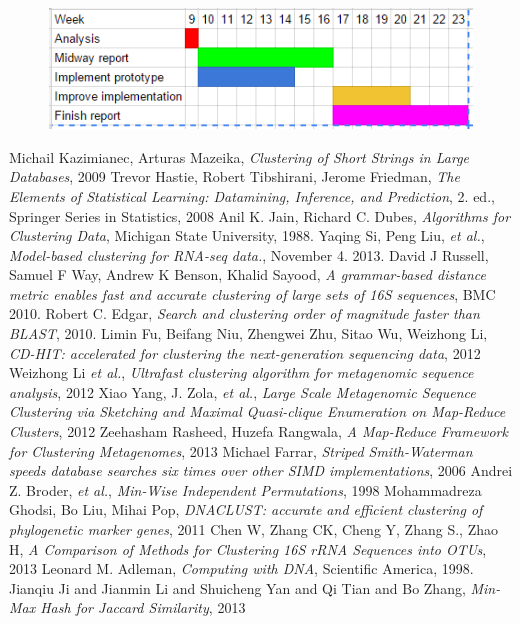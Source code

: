 \documentclass[10pt,a4paper]{article} %
\begin{document}
\begin{figure}[H]
\includegraphics[scale=1]{Gantt}
\end{figure}


\clearpage
\begin{thebibliography}{9}
   Michail Kazimianec, Arturas Mazeika, \emph{Clustering of Short Strings in Large Databases}, 2009
   Trevor Hastie, Robert Tibshirani, Jerome Friedman, \emph{The Elements of Statistical Learning: Datamining, Inference, and Prediction}, 2. ed., Springer Series in Statistics, 2008
   Anil K. Jain, Richard C. Dubes, \emph{Algorithms for Clustering Data}, Michigan State University, 1988.
   Yaqing Si, Peng Liu, \emph{et al.}, \emph{Model-based clustering for RNA-seq data.}, November 4. 2013.
   David J Russell, Samuel F Way, Andrew K Benson, Khalid Sayood, \emph{A grammar-based distance metric enables fast and accurate clustering of large sets of 16S sequences}, BMC 2010.
   Robert C. Edgar, \emph{Search and clustering order of magnitude faster than BLAST}, 2010.
   Limin Fu, Beifang Niu, Zhengwei Zhu, Sitao Wu, Weizhong Li, \emph{CD-HIT: accelerated for clustering the next-generation sequencing data}, 2012
  Weizhong Li \emph{et al.}, \emph{Ultrafast clustering algorithm for metagenomic sequence analysis}, 2012
  Xiao Yang, J. Zola, \emph{et al.}, \emph{Large Scale Metagenomic Sequence Clustering via Sketching and Maximal Quasi-clique Enumeration on Map-Reduce Clusters}, 2012
  Zeehasham Rasheed, Huzefa Rangwala, \emph{A Map-Reduce Framework for Clustering Metagenomes}, 2013
  Michael Farrar, \emph{Striped Smith-Waterman speeds database searches six times over other SIMD implementations}, 2006
  Andrei Z. Broder, \emph{et al.}, \emph{Min-Wise Independent Permutations}, 1998
  Mohammadreza Ghodsi, Bo Liu, Mihai Pop, \emph{DNACLUST: accurate and efficient clustering of phylogenetic marker genes}, 2011
  Chen W, Zhang CK, Cheng Y, Zhang S., Zhao H, \emph{A Comparison of Methods for Clustering 16S rRNA Sequences into OTUs}, 2013
  Leonard M. Adleman, \emph{Computing with DNA}, Scientific America, 1998.
  Jianqiu Ji and Jianmin Li and Shuicheng Yan and Qi Tian and Bo Zhang, \emph{Min-Max Hash for Jaccard Similarity}, 2013
\end{thebibliography}
\end{document}
